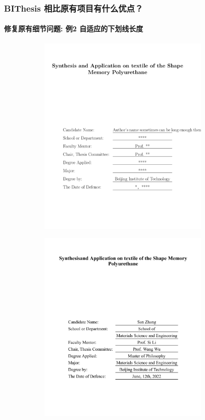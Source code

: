 \documentclass[
  aspectratio=169,
  presentation,
  titlegraphic=./images/bit.png,
  framelogo=./images/bit.png
]{bitbeamer}
\begin{document}
\begin{frame}[t]
  \frametitle{BIThesis 相比原有项目有什么优点？}
  \framesubtitle{修复原有细节问题: 例2 自适应的下划线长度}

  \vspace{-0.8cm}

  \begin{figure}
    \begin{subfigure}{0.45\textwidth}
      \includegraphics[width=0.9\textwidth]{images/6-1.png}
    \end{subfigure}
    \begin{subfigure}{0.45\textwidth}
      \includegraphics[width=0.9\textwidth]{images/6-2.png}

\end{subfigure}
\end{figure}
\end{frame}
\end{document}
